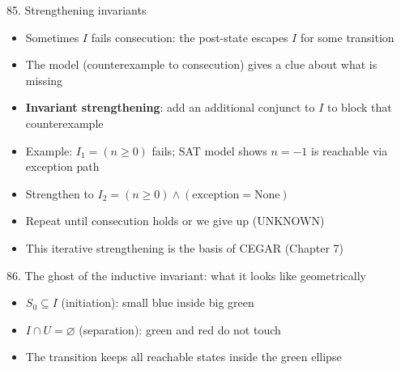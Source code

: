 \documentclass[aspectratio=169]{beamer}
\begin{document}
\begin{frame}{85. Strengthening invariants}
\begin{itemize}
  \item Sometimes \(I\) fails consecution: the post-state escapes \(I\) for some transition
  \item The model (counterexample to consecution) gives a clue about what is missing
  \item \textbf{Invariant strengthening}: add an additional conjunct to \(I\) to block that counterexample
  \item Example: \(I_1 = (n \ge 0)\) fails; SAT model shows \(n = -1\) is reachable via exception path
  \item Strengthen to \(I_2 = (n \ge 0) \wedge (\text{exception} = \text{None})\)
  \item Repeat until consecution holds or we give up (UNKNOWN)
  \item This iterative strengthening is the basis of CEGAR (Chapter 7)
\end{itemize}
\end{frame}

\begin{frame}{86. The ghost of the inductive invariant: what it looks like geometrically}
\begin{center}
\end{center}
\begin{itemize}
  \item \(S_0 \subseteq I\) (initiation): small blue inside big green
  \item \(I \cap U = \varnothing\) (separation): green and red do not touch
  \item The transition keeps all reachable states inside the green ellipse
\end{itemize}
\end{frame}
\end{document}
